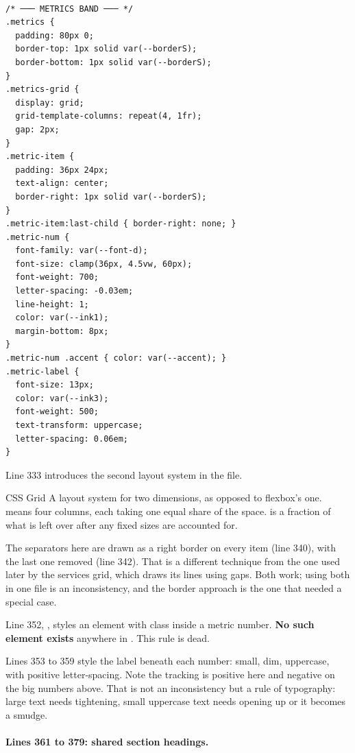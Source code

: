 \begin{lstlisting}[firstnumber=325,caption={\file{css/site.css}, lines 325--359}]

/* ─── METRICS BAND ─── */
.metrics {
  padding: 80px 0;
  border-top: 1px solid var(--borderS);
  border-bottom: 1px solid var(--borderS);
}
.metrics-grid {
  display: grid;
  grid-template-columns: repeat(4, 1fr);
  gap: 2px;
}
.metric-item {
  padding: 36px 24px;
  text-align: center;
  border-right: 1px solid var(--borderS);
}
.metric-item:last-child { border-right: none; }
.metric-num {
  font-family: var(--font-d);
  font-size: clamp(36px, 4.5vw, 60px);
  font-weight: 700;
  letter-spacing: -0.03em;
  line-height: 1;
  color: var(--ink1);
  margin-bottom: 8px;
}
.metric-num .accent { color: var(--accent); }
.metric-label {
  font-size: 13px;
  color: var(--ink3);
  font-weight: 500;
  text-transform: uppercase;
  letter-spacing: 0.06em;
}
\end{lstlisting}

Line 333 introduces the second layout system in the file.

\begin{jargon}{CSS Grid}
A layout system for two dimensions, as opposed to flexbox's one.
 means four columns, each taking one
equal share of the space.  is a fraction of what is left over after any
fixed sizes are accounted for.
\end{jargon}

The separators here are drawn as a right border on every item (line 340), with the
last one removed (line 342). That is a different technique from the one used later
by the services grid, which draws its lines using gaps. Both work; using both in
one file is an inconsistency, and the border approach is the one that needed a
special case.

Line 352, , styles an element with class 
inside a metric number. \textbf{No such element exists} anywhere in
. This rule is dead.

Lines 353 to 359 style the label beneath each number: small, dim, uppercase, with
positive letter-spacing. Note the tracking is positive here and negative on the
big numbers above. That is not an inconsistency but a rule of typography: large
text needs tightening, small uppercase text needs opening up or it becomes a
smudge.

\paragraph{Lines 361 to 379: shared section headings.}


